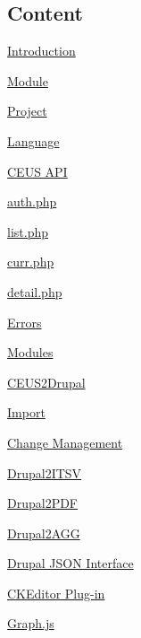 \hypertarget{index_pageTOC}{}\subsection{Content}\label{index_pageTOC}

\begin{DoxyEnumerate}
\item \hyperlink{index_Introduction}{Introduction}
\begin{DoxyEnumerate}
\item \hyperlink{index_Module_Intro}{Module}
\item \hyperlink{index_Project_Intro}{Project}
\item \hyperlink{index_Language}{Language}
\end{DoxyEnumerate}
\item \hyperlink{index_ceusapi}{C\+E\+U\+S A\+P\+I}
\begin{DoxyEnumerate}
\item \hyperlink{index_auth}{auth.\+php}
\item \hyperlink{index_list}{list.\+php}
\item \hyperlink{index_curr}{curr.\+php}
\item \hyperlink{index_detail}{detail.\+php}
\item \hyperlink{index_Errors}{Errors}
\end{DoxyEnumerate}
\item \hyperlink{index_Modules}{Modules}
\begin{DoxyEnumerate}
\item \hyperlink{index_CEUS2Drupal}{C\+E\+U\+S2\+Drupal}
\begin{DoxyEnumerate}
\item \hyperlink{index_Import}{Import}
\item \hyperlink{index_change_management}{Change Management}
\end{DoxyEnumerate}
\item \hyperlink{index_Drupal2ITSV}{Drupal2\+I\+T\+S\+V}
\item \hyperlink{index_Drupal2PDF}{Drupal2\+P\+D\+F}
\item \hyperlink{index_Drupal2AGG}{Drupal2\+A\+G\+G}
\begin{DoxyEnumerate}
\item \hyperlink{index_json}{Drupal J\+S\+O\+N Interface}
\item \hyperlink{index_plugin}{C\+K\+Editor Plug-\/in}
\item \hyperlink{index_graph}{Graph.\+js}
\end{DoxyEnumerate}

\end{DoxyEnumerate}
\end{DoxyEnumerate}
